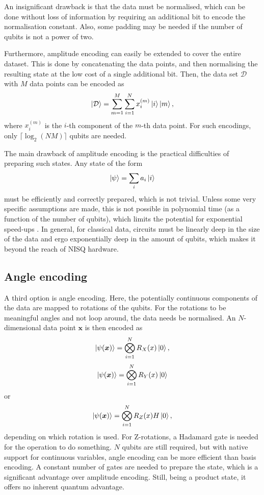 An insignificant drawback is that the data must be normalised, which can be done without loss of information by requiring an additional bit to encode the normalisation constant.
Also, some padding may be needed if the number of qubits is not a power of two.

Furthermore, amplitude encoding can easily be extended to cover the entire dataset.
This is done by concatenating the data points, and then normalising the resulting state at the low cost of a single additional bit.
Then, the data set $\mathcal{D}$ with $M$ data points can be encoded as
\begin{equation}
    \ket{\mathcal{D}} = \sum_{m=1}^M \sum_{i=1}^{N} x_i^{(m)} \ket{i} \ket{m},
\end{equation}
where $x_i^{(m)}$ is the $i$-th component of the $m$-th data point.
For such encodings, only $\lceil \log_2 (N M) \rceil$ qubits are needed.

The main drawback of amplitude encoding is the practical difficulties of preparing such states.
Any state of the form
\begin{equation}
    \ket{\psi} = \sum_{i} a_i \ket{i}
\end{equation}
must be efficiently and correctly prepared, which is not trivial.
Unless some very specific assumptions are made, this is not possible in polynomial time (as a function of the number of qubits), which limits the potential for exponential speed-ups \cite{textbook}.
In general, for classical data, circuits must be linearly deep in the size of the data and ergo exponentially deep in the amount of qubits, which makes it beyond the reach of NISQ hardware.

\subsection{Angle encoding}
A third option is angle encoding.
Here, the potentially continuous components of the data are mapped to rotations of the qubits.
For the rotations to be meaningful angles and not loop around, the data needs be normalised.
An $N$-dimensional data point $\bm{x}$ is then encoded as
\begin{equation}
    \ket{\psi(\bm{x})} = \bigotimes_{i=1}^{N} R_X(x) \ket{0},
\end{equation}
\begin{equation}
    \ket{\psi(\bm{x})} = \bigotimes_{i=1}^{N} R_Y(x) \ket{0}
\end{equation}
or
\begin{equation}
    \ket{\psi(\bm{x})} = \bigotimes_{i=1}^{N} R_Z(x) H \ket{0},
\end{equation}
depending on which rotation is used.
For Z-rotations, a Hadamard gate is needed for the operation to do something.
$N$ qubits are still required, but with native support for continuous variables, angle encoding can be more efficient than basis encoding.
A constant number of gates are needed to prepare the state, which is a significant advantage over amplitude encoding.
Still, being a product state, it offers no inherent quantum advantage.


